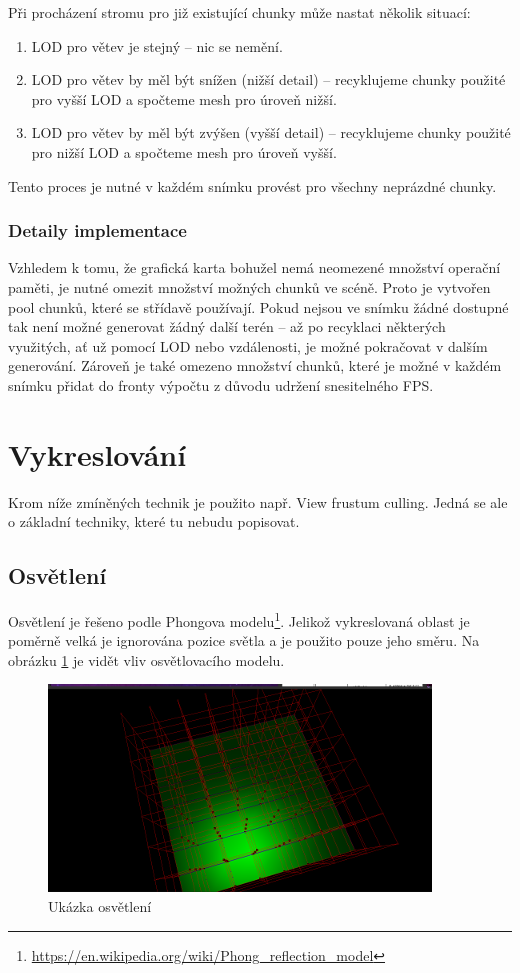 \documentclass[12pt,a4paper,titlepage,final]{report}
\begin{document}
Při procházení stromu pro již existující chunky může nastat několik situací:
\begin{enumerate}
    \item LOD pro větev je stejný -- nic se nemění.
    \item LOD pro větev by měl být snížen (nižší detail) -- recyklujeme chunky použité pro vyšší LOD a spočteme mesh pro úroveň nižší.
    \item LOD pro větev by měl být zvýšen (vyšší detail) -- recyklujeme chunky použité pro nižší LOD a spočteme mesh pro úroveň vyšší.
\end{enumerate}

Tento proces je nutné v každém snímku provést pro všechny neprázdné chunky.

\subsubsection{Detaily implementace}
Vzhledem k tomu, že grafická karta bohužel nemá neomezené množství operační paměti, je nutné omezit množství možných chunků ve scéně. Proto je vytvořen pool chunků, které se střídavě používají. Pokud nejsou ve snímku žádné dostupné tak není možné generovat žádný další terén -- až po recyklaci některých využitých, ať už pomocí LOD nebo vzdálenosti, je možné pokračovat v dalším generování. Zároveň je také omezeno množství chunků, které je možné v každém snímku přidat do fronty výpočtu z důvodu udržení snesitelného FPS.

\section{Vykreslování}
Krom níže zmíněných technik je použito např. View frustum culling. Jedná se ale o základní techniky, které tu nebudu popisovat. 

\subsection{Osvětlení}
Osvětlení je řešeno podle Phongova modelu\footnote{\url{https://en.wikipedia.org/wiki/Phong_reflection_model}}. Jelikož vykreslovaná oblast je poměrně velká je ignorována pozice světla a je použito pouze jeho směru. Na obrázku \ref{fig:light} je vidět vliv osvětlovacího modelu.

\begin{figure}[H]
    \centering
    \includegraphics[scale=1]{images/light.png}
    \caption{Ukázka osvětlení}
    \label{fig:light}
\end{figure}
\end{document}
